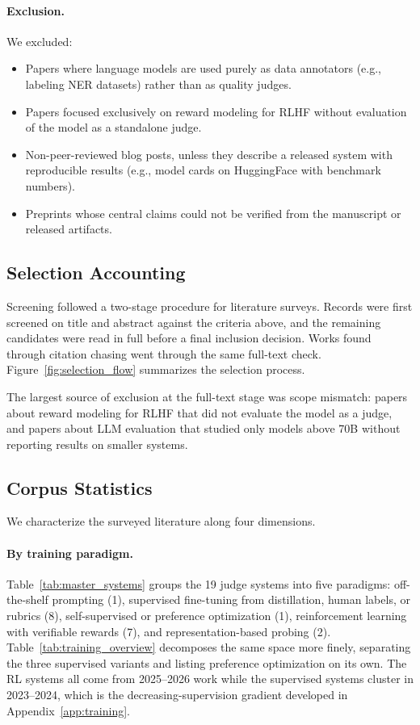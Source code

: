 \paragraph{Exclusion.} We excluded:
\begin{itemize}[leftmargin=1.2em, itemsep=2pt]
  \item Papers where language models are used purely as data annotators (e.g., labeling NER datasets) rather than as quality judges.
  \item Papers focused exclusively on reward modeling for RLHF without evaluation of the model as a standalone judge.
  \item Non-peer-reviewed blog posts, unless they describe a released system with reproducible results (e.g., model cards on HuggingFace with benchmark numbers).
  \item Preprints whose central claims could not be verified from the manuscript or released artifacts.
\end{itemize}

\subsection{Selection Accounting}

Screening followed a two-stage procedure for literature surveys. Records were first screened on title and abstract against the criteria above, and the remaining candidates were read in full before a final inclusion decision. Works found through citation chasing went through the same full-text check. Figure~\ref{fig:selection_flow} summarizes the selection process.

The largest source of exclusion at the full-text stage was scope mismatch: papers about reward modeling for RLHF that did not evaluate the model as a judge, and papers about LLM evaluation that studied only models above 70B without reporting results on smaller systems.

\subsection{Corpus Statistics}
\label{sec:corpus_stats}

We characterize the surveyed literature along four dimensions.

\paragraph{By training paradigm.} Table~\ref{tab:master_systems} groups the 19 judge systems into five paradigms: off-the-shelf prompting (1), supervised fine-tuning from distillation, human labels, or rubrics (8), self-supervised or preference optimization (1), reinforcement learning with verifiable rewards (7), and representation-based probing (2). Table~\ref{tab:training_overview} decomposes the same space more finely, separating the three supervised variants and listing preference optimization on its own. The RL systems all come from 2025--2026 work while the supervised systems cluster in 2023--2024, which is the decreasing-supervision gradient developed in Appendix~\ref{app:training}.

